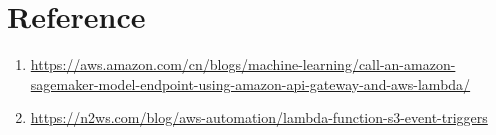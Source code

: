 \documentclass[12pt]{article}
\begin{document}
\newpage
\section{Reference}

\begin{enumerate}
\item \url{https://aws.amazon.com/cn/blogs/machine-learning/call-an-amazon-sagemaker-model-endpoint-using-amazon-api-gateway-and-aws-lambda/}

\item \url{https://n2ws.com/blog/aws-automation/lambda-function-s3-event-triggers}


\end{enumerate}






\setlength{\parskip}{1em}
\end{document}
